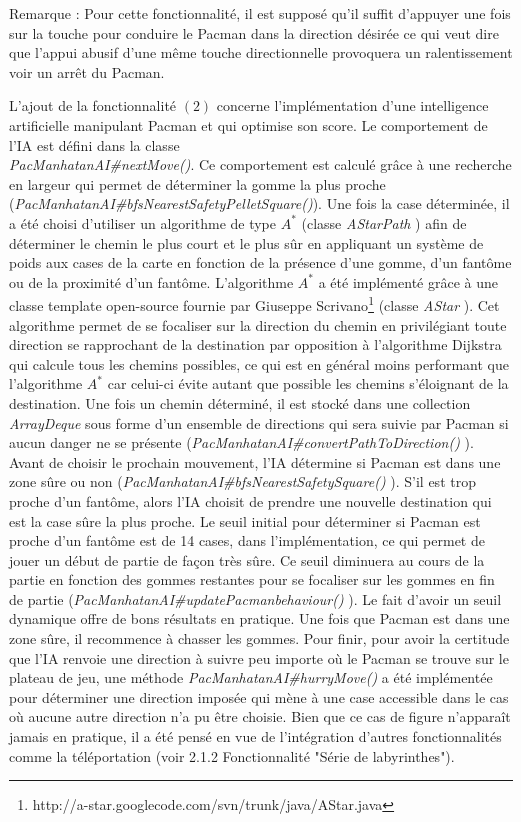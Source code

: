 \documentclass[12pt, openany]{report}
\begin{document}
Remarque : Pour cette fonctionnalité, il est supposé qu'il suffit d'appuyer une fois sur la touche pour conduire le Pacman dans la direction désirée ce qui veut dire que l'appui abusif d'une même touche directionnelle provoquera un ralentissement voir un arrêt du Pacman.

L'ajout de la fonctionnalité $(2)$ concerne l'implémentation d'une intelligence artificielle manipulant Pacman et qui optimise son score. Le comportement de l'IA est défini dans la classe\\
 \mbox{\textit{PacManhatanAI\#nextMove()}}. Ce comportement est calculé grâce à une recherche en largeur qui permet de déterminer la gomme la plus proche (\mbox{\textit{PacManhatanAI\#bfsNearestSafetyPelletSquare()}}). Une fois la case déterminée, il a été choisi d'utiliser un algorithme de type $A^*$ (classe \mbox{\textit{AStarPath}}
) afin de déterminer le chemin le plus court et le plus sûr en appliquant un système de poids aux cases de la carte en fonction de la présence d'une gomme, d'un fantôme ou de la proximité d'un fantôme. L'algorithme $A^*$ a été implémenté grâce à une classe template open-source fournie par Giuseppe Scrivano\footnote{http://a-star.googlecode.com/svn/trunk/java/AStar.java}
(classe \mbox{\textit{AStar}}
). Cet algorithme permet de se focaliser sur la direction du chemin en privilégiant toute direction se rapprochant de la destination par opposition à l'algorithme Dijkstra qui calcule tous les chemins possibles, ce qui est en général moins performant que l'algorithme $A^*$ car celui-ci évite autant que possible les chemins s'éloignant de la destination. Une fois un chemin déterminé, il est stocké dans une collection \textit{ArrayDeque} sous forme d'un ensemble de directions qui sera suivie par Pacman si aucun danger ne se présente (\mbox{\textit{PacManhatanAI\#convertPathToDirection()}}
). Avant de choisir le prochain mouvement, l'IA détermine si Pacman est dans une zone sûre ou non (\mbox{\textit{PacManhatanAI\#bfsNearestSafetySquare()}}
). S'il est trop proche d'un fantôme, alors l'IA choisit de prendre une nouvelle destination qui est la case sûre la plus proche. Le seuil initial pour déterminer si Pacman est proche d'un fantôme est de 14 cases, dans l'implémentation, ce qui permet de jouer un début de partie de façon très sûre. Ce seuil diminuera au cours de la partie en fonction des gommes restantes pour se focaliser sur les gommes en fin de partie (\mbox{\textit{PacManhatanAI\#updatePacmanbehaviour()}}
). Le fait d'avoir un seuil dynamique offre de bons résultats en pratique. Une fois que Pacman est dans une zone sûre, il recommence à chasser les gommes. Pour finir, pour avoir la certitude que l'IA renvoie une direction à suivre peu importe où le Pacman se trouve sur le plateau de jeu, une méthode \mbox{\textit{PacManhatanAI\#hurryMove()}}
a été implémentée pour déterminer une direction imposée qui mène à une case accessible dans le cas où aucune autre direction n'a pu être choisie. Bien que ce cas de figure n'apparaît jamais en pratique, il a été pensé en vue de l'intégration d'autres fonctionnalités comme la téléportation (voir 2.1.2 Fonctionnalité "Série de labyrinthes").
\end{document}
